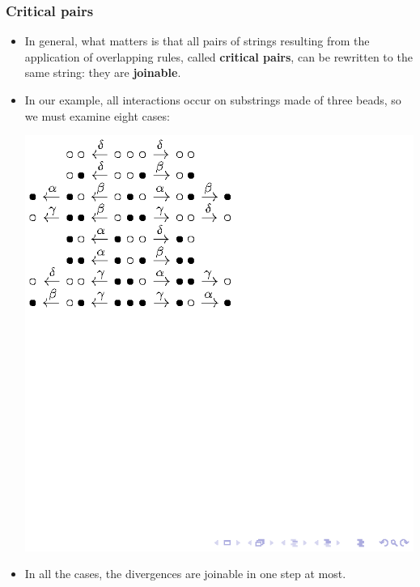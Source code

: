\documentclass[compress,dvips,xcolor={dvipsnames},t]{beamer}
\begin{document}
\begin{frame}
  \frametitle{Critical pairs}

  \begin{itemize}

    \item In general, what matters is that all pairs of strings
      resulting from the application of overlapping rules, called
      \textbf{critical pairs}, can be rewritten to the same string:
      they are \textbf{joinable}.

    \item In our example, all interactions occur on substrings made of
      three beads, so we must examine eight cases:
      \begin{center}
        \includegraphics[bb=110 670 250 790]{bullets}
      \end{center}

    \item In all the cases, the divergences are joinable in one step
      at most.

  \end{itemize}

\end{frame}
\end{document}
